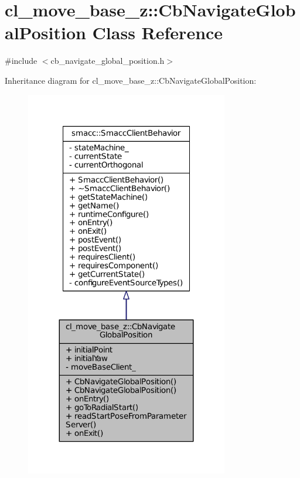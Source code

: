 \hypertarget{classcl__move__base__z_1_1CbNavigateGlobalPosition}{}\section{cl\+\_\+move\+\_\+base\+\_\+z\+:\+:Cb\+Navigate\+Global\+Position Class Reference}
\label{classcl__move__base__z_1_1CbNavigateGlobalPosition}


{\ttfamily \#include $<$cb\+\_\+navigate\+\_\+global\+\_\+position.\+h$>$}



Inheritance diagram for cl\+\_\+move\+\_\+base\+\_\+z\+:\+:Cb\+Navigate\+Global\+Position\+:
\nopagebreak
\begin{figure}[H]
\begin{center}
\leavevmode
\includegraphics[width=251pt]{classcl__move__base__z_1_1CbNavigateGlobalPosition__inherit__graph}
\end{center}
\end{figure}


